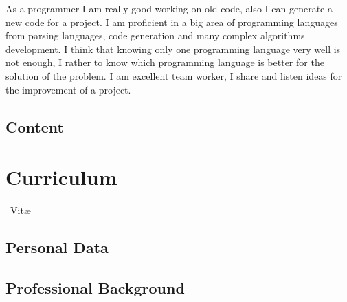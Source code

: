 \documentclass[11pt,a4paper,roman]{moderncv}
\begin{document}
\vspace*{2mm}

As a programmer I am really good working on old code, also I can generate a new code for a project. I am proficient in a big area of programming languages from parsing languages, code generation and many complex algorithms development. I think that knowing only one programming language very well is not enough, I rather to know which programming language is better for the solution of the problem. I am excellent team worker, I share and listen ideas for the improvement of a project.

\vfill

\begin{minipage}{1.0\textwidth}
	\section{Content}
	\tableofcontents
\end{minipage}

\newpage

\pagestyle{fancy}
\chapter{Curriculum}{~Vit\ae}
\makequote

\section{Personal Data}



\section{Professional Background} 
\end{document}
